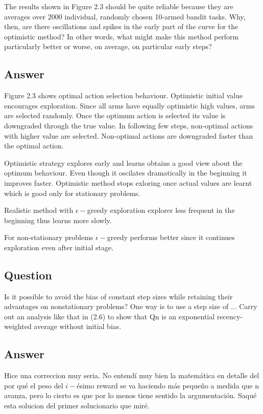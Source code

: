 \documentclass{article}
\def\red{\color{red}}
\begin{document}
    The results shown in Figure 2.3 should be quite reliable because
    they are averages over 2000 individual, randomly chosen 10-armed bandit tasks. Why, then, are there
    oscillations and spikes in the early part of the curve for the optimistic method? In other words, what
    might make this method perform particularly better or worse, on average, on particular early steps?

    \subsection*{Answer}

    Figure 2.3 shows optimal action selection behaviour.
    Optimistic initial value encourages exploration.
    Since all arms have equally optimistic high values, arms are selected randomly.
    Once the optimum action is selected its value is downgraded through the true value.
    In following few steps, non-optimal actions with higher value are selected.
    Non-optimal actions are downgraded faster than the optimal action.

    Optimistic strategy explores early and learns obtains a good view about the optimum behaviour.
    Even though it oscilates dramatically in the beginning it improves faster.
    Optimistic method stops exloring once actual values are learnt which is good only for stationary problems.

    Realistic method with $\epsilon-$greedy exploration explorer less frequent in the beginning thus learns more slowly.

    For non-stationary problems $\epsilon-$greedy performs better since it continues exploration even after initial stage.

    \subsection{Question}
    Is it possible to avoid the bias of constant step sizes while retaining their advantages on nonstationary problems? One way is to use a step size of ...
    Carry out an analysis like that in (2.6) to show that Qn is an exponential recency-weighted average without initial bias.

    \subsection*{Answer}

    {\red Hice una correccion muy seria. No entendí muy bien la matemática en detalle del por qué el peso del $i-$ésimo reward se va haciendo más pequeño a medida que n avanza, pero lo cierto es que por lo menos tiene sentido la argumentación. Saqué esta solucion del primer solucionario que miré.}
\end{document}
